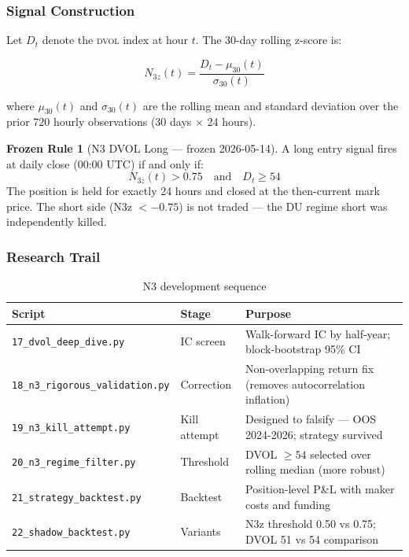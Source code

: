\documentclass[12pt, a4paper]{article}
\theoremstyle{definition}
\newtheorem{rule_}{Frozen Rule}[section]
\newcommand{\DVOL}{\textsc{dvol}}
\newcommand{\Nz}{N_{3z}}
\begin{document}
\subsubsection{Signal Construction}

Let $D_t$ denote the \DVOL{} index at hour $t$.
The 30-day rolling z-score is:

\begin{equation}
    \Nz(t) = \frac{D_t - \mu_{30}(t)}{\sigma_{30}(t)}
    \label{eq:n3z}
\end{equation}

where $\mu_{30}(t)$ and $\sigma_{30}(t)$ are the rolling mean and standard
deviation over the prior 720 hourly observations (30 days $\times$ 24 hours).

\begin{rule_}[N3 DVOL Long — frozen 2026-05-14]
\label{rule:n3}
A long entry signal fires at daily close (00:00 UTC) if and only if:
\begin{equation}
    \Nz(t) > 0.75 \quad \text{and} \quad D_t \geq 54
    \label{eq:n3_rule}
\end{equation}
The position is held for exactly 24 hours and closed at the then-current
mark price. The short side (N3z $< -0.75$) is not traded — the DU
regime short was independently killed.
\end{rule_}

\subsubsection{Research Trail}

\begin{table}[H]
\centering
\caption{N3 development sequence}
\begin{tabularx}{\linewidth}{llX}
\toprule
\textbf{Script} & \textbf{Stage} & \textbf{Purpose} \\
\midrule
\texttt{17\_dvol\_deep\_dive.py} & IC screen & Walk-forward IC by half-year; block-bootstrap 95\% CI \\
\texttt{18\_n3\_rigorous\_validation.py} & Correction & Non-overlapping return fix (removes autocorrelation inflation) \\
\texttt{19\_n3\_kill\_attempt.py} & Kill attempt & Designed to falsify — OOS 2024-2026; strategy survived \\
\texttt{20\_n3\_regime\_filter.py} & Threshold & DVOL $\geq 54$ selected over rolling median (more robust) \\
\texttt{21\_strategy\_backtest.py} & Backtest & Position-level P\&L with maker costs and funding \\
\texttt{22\_shadow\_backtest.py} & Variants & N3z threshold 0.50 vs 0.75; DVOL 51 vs 54 comparison \\
\bottomrule
\end{tabularx}
\end{table}
\end{document}
